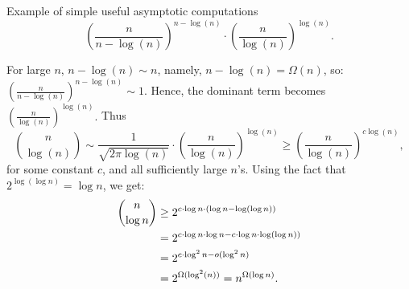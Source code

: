 \begin{trailer}{Example of simple useful asymptotic computations}
   \[
   \left(\frac{n}{n - \log(n)}\right)^{n - \log(n)} \cdot \left(\frac{n}{\log(n)}\right)^{\log(n)}.
   \]

For large \(n\), \(n - \log(n) \sim n\), namely, $n-\log (n) =\Omega(n)$, so:
 $
   \left(\frac{n}{n - \log(n)}\right)^{n - \log(n)} \sim 1.
 $
Hence, the dominant term becomes $\left(\frac{n}{\log(n)}\right)^{\log(n)}.$
Thus 
\[
\binom{n}{\log(n)} \sim \frac{1}{\sqrt{2 \pi \log(n)}} 
\cdot \left(\frac{n}{\log(n)}\right)^{\log(n)}
\ge  \left(\frac{n}{\log(n)}\right)^{c\log(n)}, 
\]
for some constant $c$, and all sufficiently large $n$'s.
%
Using the fact that $2^{\log(\log n)}=\log n$,  we get:
\begin{align*}
\binom{n}{\log n} & \ge 2^{c\cdot\log n\cdot(\log n-\log(\log n))}\\
&   = 
2^{c\cdot\log n\cdot\log n-c\cdot\log n \cdot\log(\log n))}\\
&   = 
2^{c\cdot\log^2 n-o(\log ^2n)}\\
&   =
2^{\Omega(\log^2(n))} = n^{\Omega(\log n)}.
\end{align*}

\end{trailer}
% 
% 
% 
% 
% 
% 
% 
% 
% 
% 
